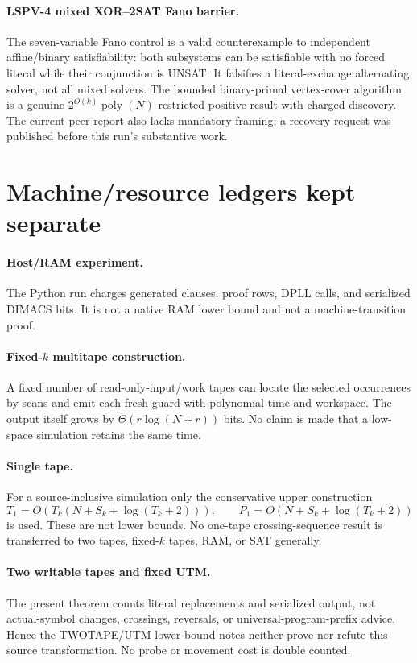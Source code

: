 \documentclass[11pt]{article}
\begin{document}
\paragraph{LSPV-4 mixed XOR--2SAT Fano barrier.}
The seven-variable Fano control is a valid counterexample to independent
affine/binary satisfiability: both subsystems can be satisfiable with no forced
literal while their conjunction is UNSAT.  It falsifies a literal-exchange
alternating solver, not all mixed solvers.  The bounded binary-primal
vertex-cover algorithm is a genuine \(2^{O(k)}\operatorname{poly}(N)\)
restricted positive result with charged discovery.  The current peer report
also lacks mandatory framing; a recovery request was published before this
run's substantive work.

\section{Machine/resource ledgers kept separate}
\paragraph{Host/RAM experiment.}
The Python run charges generated clauses, proof rows, DPLL calls, and serialized
DIMACS bits.  It is not a native RAM lower bound and not a machine-transition
proof.
\paragraph{Fixed-\(k\) multitape construction.}
A fixed number of read-only-input/work tapes can locate the selected
occurrences by scans and emit each fresh guard with polynomial time and
workspace.  The output itself grows by \(\Theta(r\log(N+r))\) bits.  No
claim is made that a low-space simulation retains the same time.
\paragraph{Single tape.}
For a source-inclusive simulation only the conservative upper construction
\[
T_1=O\!\left(T_k(N+S_k+\log(T_k+2))\right),\qquad
P_1=O\!\left(N+S_k+\log(T_k+2)\right)
\]
is used.  These are not lower bounds.  No one-tape crossing-sequence result is
transferred to two tapes, fixed-\(k\) tapes, RAM, or SAT generally.
\paragraph{Two writable tapes and fixed UTM.}
The present theorem counts literal replacements and serialized output, not
actual-symbol changes, crossings, reversals, or universal-program-prefix
advice.  Hence the TWOTAPE/UTM lower-bound notes neither prove nor refute this
source transformation.  No probe or movement cost is double counted.
\end{document}
